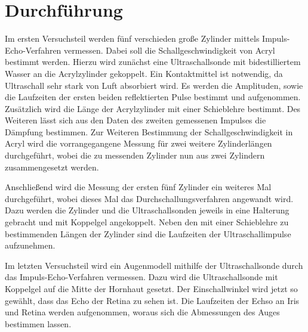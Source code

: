 \section{Durchführung}
\label{sec:Durchführung}
Im ersten Versuchsteil werden fünf verschieden große 
Zylinder mittels Impuls-Echo-Verfahren vermessen.
Dabei soll die Schallgeschwindigkeit von Acryl 
bestimmt werden.
Hierzu wird zunächst eine Ultraschallsonde mit bidestilliertem 
Wasser an die Acrylzylinder gekoppelt. Ein Kontaktmittel ist
notwendig, da Ultraschall sehr stark von Luft absorbiert wird.
Es werden die Amplituden, sowie die Laufzeiten der ersten
beiden reflektierten Pulse bestimmt und aufgenommen.
Zusätzlich wird die Länge der Acrylzylinder mit einer Schieblehre 
bestimmt. 
Des Weiteren lässt sich aus den Daten des zweiten gemessenen
Impulses die Dämpfung bestimmen.
Zur Weiteren Bestimmung der Schallgeschwindigkeit in Acryl
wird die vorrangegangene Messung für zwei weitere Zylinderlängen
durchgeführt, wobei die zu messenden Zylinder nun aus 
zwei Zylindern zusammengesetzt werden. 


Anschließend wird die Messung der ersten fünf Zylinder 
ein weiteres Mal durchgeführt, wobei dieses Mal das 
Durchschallungsverfahren angewandt wird. Dazu werden die 
Zylinder und die Ultraschallsonden jeweils in eine Halterung
gebracht und mit Koppelgel angekoppelt. Neben den mit einer
Schieblehre zu bestimmenden Längen der Zylinder sind die Laufzeiten 
der Ultraschallimpulse aufzunehmen.


Im letzten Versuchsteil wird ein Augenmodell mithilfe der Ultraschallsonde
durch das Impuls-Echo-Verfahren vermessen. Dazu wird 
die Ultraschallsonde mit Koppelgel auf die Mitte der Hornhaut
gesetzt. Der Einschallwinkel wird jetzt so gewählt, dass 
das Echo der Retina zu sehen ist. Die Laufzeiten der Echso
an Iris und Retina werden aufgenommen, woraus sich die Abmessungen 
des Auges bestimmen lassen.
